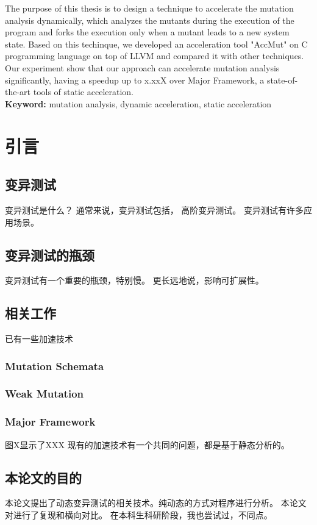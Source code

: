 \documentclass[nofonts]{ctexrep}
\begin{document}
The purpose of this thesis is to design a technique to accelerate the mutation analysis dynamically, which analyzes the mutants during the execution of the program and forks the execution only when a mutant leads to a new system state. Based on this techinque, we developed an acceleration tool "AccMut" on C programming language on top of LLVM and compared it with other techniques. Our experiment show that our approach can accelerate mutation analysis significantly, having a speedup up to x.xxX over Major Framework, a state-of-the-art tools of static acceleration. \\

\textbf{Keyword:} mutation analysis, dynamic acceleration, static acceleration
\tableofcontents


\chapter{引言}
\section{变异测试}
变异测试是什么？
通常来说，变异测试包括，
高阶变异测试。
变异测试有许多应用场景。
\section{变异测试的瓶颈}
变异测试有一个重要的瓶颈，特别慢。
更长远地说，影响可扩展性。
\section{相关工作}
已有一些加速技术
\subsection{Mutation Schemata}
\subsection{Weak Mutation}
\subsection{Major Framework}
图X显示了XXX
现有的加速技术有一个共同的问题，都是基于静态分析的。
\section{本论文的目的}
本论文提出了动态变异测试的相关技术。纯动态的方式对程序进行分析。
本论文对进行了复现和横向对比。
在本科生科研阶段，我也尝试过，不同点。
\end{document}
